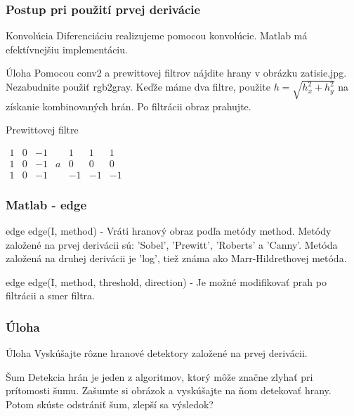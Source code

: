\documentclass{beamer}
\begin{document}
\begin{frame}
\frametitle{Postup pri použití prvej derivácie}
  \begin{block}{Konvolúcia}
  Diferenciáciu realizujeme pomocou konvolúcie. Matlab má efektívnejšiu implementáciu.
  \end{block}

  \begin{block}{Úloha}
  Pomocou conv2 a prewittovej filtrov nájdite hrany v obrázku zatisie.jpg. Nezabudnite použiť rgb2gray. Keďže máme dva filtre, použite $h = \sqrt{h_x^2 + h_y^2}$ na získanie kombinovaných hrán. Po filtrácii obraz prahujte.
  \end{block}
 
  \begin{block}{Prewittovej filtre}
  \begin{center}
  $\begin{matrix}
    1 & 0 & -1 &    & 1 & 1 & 1 \\
    1 & 0 & -1 & a & 0 & 0 & 0 \\
    1 & 0 & -1 &    & -1 & - 1 & -1
  \end{matrix}$
  \end{center}
  \end{block}
\end{frame}

\begin{frame}
\frametitle{Matlab - edge}
  \begin{block}{edge}
  edge(I, method) - Vráti hranový obraz podľa metódy method. Metódy založené na prvej derivácii sú: 'Sobel', 'Prewitt', 'Roberts' a 'Canny'. Metóda založená na druhej derivácii je 'log', tiež známa ako Marr-Hildrethovej metóda.
  \end{block}
 
  \begin{block}{edge}
  edge(I, method, threshold, direction) - Je možné modifikovať prah po filtrácii a smer filtra.
  \end{block}
\end{frame}

\begin{frame}
\frametitle{Úloha}
  \begin{block}{Úloha}
  Vyskúšajte rôzne hranové detektory založené na prvej derivácii.
  \end{block}
    
  \begin{block}{Šum}
  Detekcia hrán je jeden z algoritmov, ktorý môže značne zlyhať pri prítomosti šumu. Zašumte si obrázok a vyskúšajte na ňom detekovať hrany. Potom skúste odstrániť šum, zlepší sa výsledok?
  \end{block} 
\end{frame}
\end{document}
